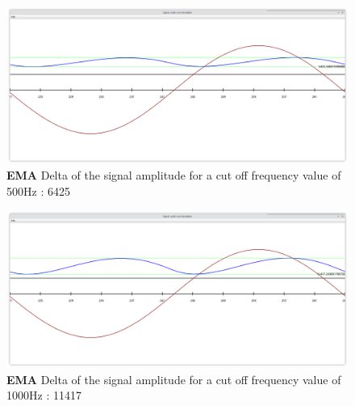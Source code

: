 \begin{figure}[!h]
	\begin{center}
		\includegraphics[width=15cm]{images/EMA500d6425.png}
	\end{center}
	\caption{\textbf{EMA} Delta of the signal amplitude for a cut off frequency value of 500Hz : 6425}
\end{figure}

\begin{figure}[!h]
	\begin{center}
		\includegraphics[width=15cm]{images/EMA1000d11417.png}
	\end{center}
	\caption{\textbf{EMA} Delta of the signal amplitude for a cut off frequency value of 1000Hz : 11417}
\end{figure}




